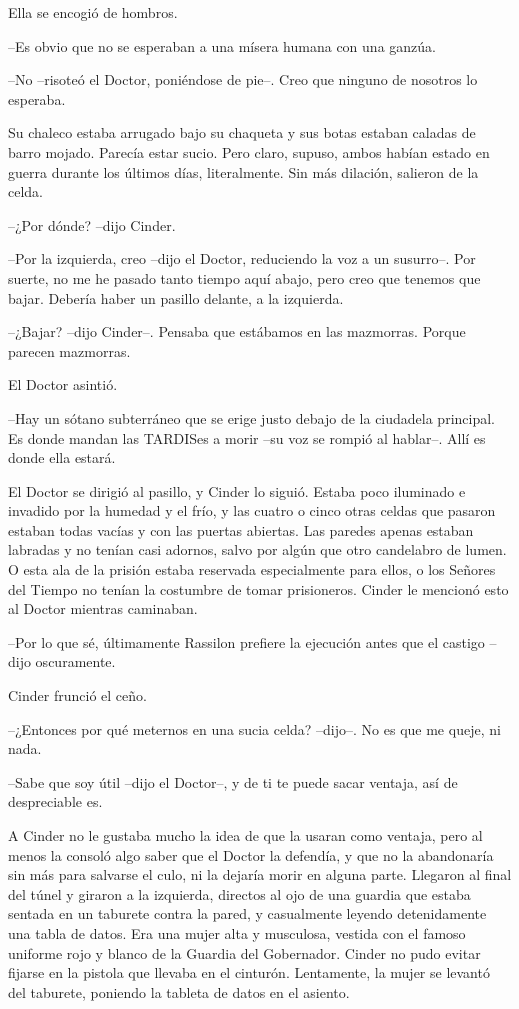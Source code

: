 Ella se encogió de hombros.

--Es obvio que no se esperaban a una mísera humana con una ganzúa.

--No --risoteó el Doctor, poniéndose de pie--. Creo que ninguno de nosotros lo esperaba.

Su chaleco estaba arrugado bajo su chaqueta y sus botas estaban caladas de barro mojado. Parecía estar sucio. Pero claro, supuso, ambos habían estado en guerra durante los últimos días, literalmente. Sin más dilación, salieron de la celda.

--¿Por dónde? --dijo Cinder.

--Por la izquierda, creo --dijo el Doctor, reduciendo la voz a un susurro--. Por suerte, no me he pasado tanto tiempo aquí abajo, pero creo que tenemos que bajar. Debería haber un pasillo delante, a la izquierda.

--¿Bajar? --dijo Cinder--. Pensaba que estábamos en las mazmorras. Porque parecen mazmorras.

El Doctor asintió.

--Hay un sótano subterráneo que se erige justo debajo de la ciudadela principal. Es donde mandan las TARDISes a morir --su voz se rompió al hablar--. Allí es donde ella estará.

El Doctor se dirigió al pasillo, y Cinder lo siguió. Estaba poco iluminado e invadido por la humedad y el frío, y las cuatro o cinco otras celdas que pasaron estaban todas vacías y con las puertas abiertas. Las paredes apenas estaban labradas y no tenían casi adornos, salvo por algún que otro candelabro de lumen. O esta ala de la prisión estaba reservada especialmente para ellos, o los Señores del Tiempo no tenían la costumbre de tomar prisioneros. Cinder le mencionó esto al Doctor mientras caminaban.

--Por lo que sé, últimamente Rassilon prefiere la ejecución antes que el castigo --dijo oscuramente.

Cinder frunció el ceño.

--¿Entonces por qué meternos en una sucia celda? --dijo--. No es que me queje, ni nada.

--Sabe que soy útil --dijo el Doctor--, y de ti te puede sacar ventaja, así de despreciable es.

A Cinder no le gustaba mucho la idea de que la usaran como ventaja, pero al menos la consoló algo saber que el Doctor la defendía, y que no la abandonaría sin más para salvarse el culo, ni la dejaría morir en alguna parte.
Llegaron al final del túnel y giraron a la izquierda, directos al ojo de una guardia que estaba sentada en un taburete contra la pared, y casualmente leyendo detenidamente una tabla de datos.  Era una mujer alta y musculosa, vestida con el famoso uniforme rojo y blanco de la Guardia del Gobernador. Cinder no pudo evitar fijarse en la pistola que llevaba en el cinturón.
Lentamente, la mujer se levantó del taburete, poniendo la tableta de datos en el asiento.

